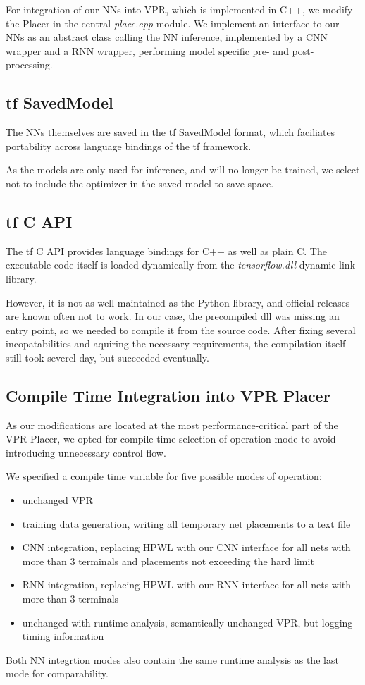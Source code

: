 For integration of our \glspl{NN} into \gls{VPR}, which is implemented in C++, we modify the Placer in the central \textit{place.cpp} module. We implement an interface to our \glspl{NN} as an abstract class calling the \gls{NN} inference, implemented by a \gls{CNN} wrapper and a \gls{RNN} wrapper, performing model specific pre- and post-processing.

\subsection{\gls{tf} SavedModel}

The \glspl{NN} themselves are saved in the \gls{tf} SavedModel format, which faciliates portability across language bindings of the \gls{tf} framework. 
	
As the models are only used for inference, and will no longer be trained, we select not to include the optimizer in the saved model to save space.

\subsection{\gls{tf} C API}

The \gls{tf} C API provides language bindings for C++ as well as plain C. The executable code itself is loaded dynamically from the \textit{tensorflow.dll} dynamic link library.

However, it is not as well maintained as the Python library, and official releases are known often not to work. In our case, the precompiled dll was missing an entry point, so we needed to compile it from the source code. After fixing several incopatabilities and aquiring the necessary requirements, the compilation itself still took severel day, but succeeded eventually.

\subsection{Compile Time Integration into \gls{VPR} Placer}

As our modifications are located at the most performance-critical part of the \gls{VPR} Placer, we opted for compile time selection of operation mode to avoid introducing unnecessary control flow. 

We specified a compile time variable for five possible modes of operation: 

\begin{itemize}
	\item unchanged \gls{VPR}
	\item training data generation, writing all temporary net placements to a text file
	\item \gls{CNN} integration, replacing \gls{HPWL} with our \gls{CNN} interface for all nets with more than 3 terminals and placements not exceeding the hard limit
	\item \gls{RNN} integration, replacing \gls{HPWL} with our \gls{RNN} interface for all nets with more than 3 terminals
	\item unchanged with runtime analysis, semantically unchanged \gls{VPR}, but logging timing information
\end{itemize}

Both \gls{NN} integrtion modes also contain the same runtime analysis as the last mode for comparability.
